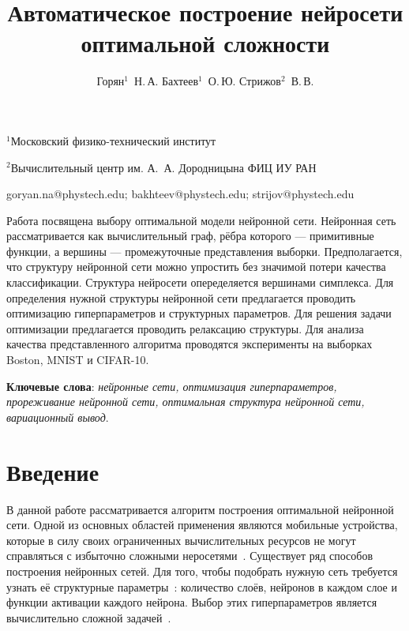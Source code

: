 \documentclass[12pt,twoside]{article}
\begin{document}
\title
    {Автоматическое построение нейросети оптимальной сложности}
\author
    {Горян$^1$~Н.\,А. Бахтеев$^1$~О.\,Ю.  Стрижов$^2$~В.\,В.} %

\organization
    {$^1$Московский физико-технический институт\par
    $^2$Вычислительный центр им. А.~А. Дородницына ФИЦ ИУ РАН}

\email
    {goryan.na@phystech.edu; bakhteev@phystech.edu; strijov@phystech.edu}    


    

\abstract
	{Работа посвящена выбору оптимальной модели нейронной сети. Нейронная сеть рассматривается как вычислительный граф, рёбра которого --- примитивные функции, а вершины --- промежуточные представления выборки. Предполагается, что структуру нейронной сети можно упростить без значимой потери качества классификации. Структура нейросети опеределяется вершинами симплекса. Для определения нужной структуры нейронной сети предлагается проводить оптимизацию гиперпараметров и структурных параметров. Для решения задачи оптимизации предлагается проводить релаксацию структуры. Для анализа качества представленного алгоритма проводятся эксперименты на выборках Boston, MNIST и CIFAR-10.
\bigskip

\textbf{Ключевые слова}: \emph {нейронные сети, оптимизация гиперпараметров, прореживание нейронной сети, оптимальная структура нейронной сети, вариационный вывод}.
}


\maketitle


\section{ Введение}
	
	В данной работе рассматривается алгоритм построения оптимальной нейронной сети. Одной из основных областей применения являются мобильные устройства, которые в силу своих ограниченных вычислительных ресурсов не могут справляться с избыточно сложными неросетями~\cite{rallapalli2016very}. Существует ряд способов построения нейронных сетей. Для того, чтобы подобрать нужную сеть требуется узнать её структурные параметры~\cite{Myung1997}: количество слоёв, нейронов в каждом слое и функции активации каждого нейрона. Выбор этих гиперпараметров является вычислительно сложной задачей~\cite{sutskever2014}.
	
\end{document}
